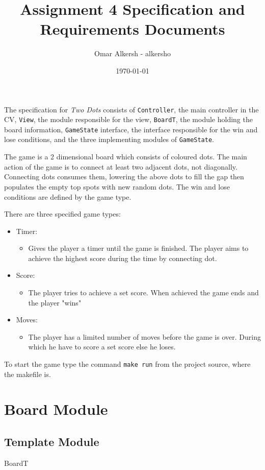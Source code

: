 \documentclass[11pt]{article}
\author{Omar Alkersh - alkersho}
\date{\today}
\title{Assignment 4 Specification and Requirements Documents}
\begin{document}
\maketitle
The specification for \emph{Two Dots} consists of \texttt{Controller}, the main controller in the CV, \texttt{View}, the module responsible for the view, \texttt{BoardT}, the module holding the board information, \texttt{GameState} interface, the interface responsible for the win and lose conditions, and the three implementing modules of \texttt{GameState}.

The game is a 2 dimensional board which consists of coloured dots. The main action of the game is to connect at least two adjacent dots, not diagonally. Connecting dots consumes them, lowering the above dots to fill the gap then populates the empty top spots with new random dots. The win and lose conditions are defined by the game type.

There are three specified game types:

\begin{itemize}
\item Timer:
\begin{itemize}
\item Gives the player a timer until the game is finished. The player aims to achieve the highest score during the time by connecting dot.
\end{itemize}
\item Score:
\begin{itemize}
\item The player tries to achieve a set score. When achieved the game ends and the player "wins"
\end{itemize}
\item Moves:
\begin{itemize}
\item The player has a limited number of moves before the game is over. During which he have to score a set score else he loses.
\end{itemize}
\end{itemize}

To start the game type the command \texttt{make run} from the project source, where the makefile is.

\newpage
\section{Board Module}
\label{sec:org8ee779e}
\subsection*{Template Module}
\label{sec:org95c2375}
BoardT
\end{document}
